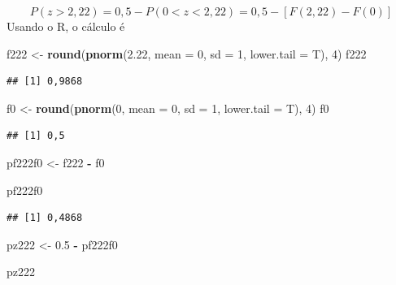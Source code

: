 \documentclass[
]{book}
\newenvironment{Shaded}{\begin{snugshade}}{\end{snugshade}}
\newcommand{\DataTypeTok}[1]{\textcolor[rgb]{0.13,0.29,0.53}{#1}}
\newcommand{\DecValTok}[1]{\textcolor[rgb]{0.00,0.00,0.81}{#1}}
\newcommand{\FloatTok}[1]{\textcolor[rgb]{0.00,0.00,0.81}{#1}}
\newcommand{\KeywordTok}[1]{\textcolor[rgb]{0.13,0.29,0.53}{\textbf{#1}}}
\newcommand{\NormalTok}[1]{#1}
\newcommand{\OperatorTok}[1]{\textcolor[rgb]{0.81,0.36,0.00}{\textbf{#1}}}
\newcommand{\StringTok}[1]{\textcolor[rgb]{0.31,0.60,0.02}{#1}}
\begin{document}
\[
  P(z>2,22) = 0,5 - P(0 < z < 2,22) = 0,5 - [F(2,22) - F(0)]
\]
Usando o R, o cálculo é

\begin{Shaded}
\begin{Highlighting}[]
\NormalTok{f222 <-}\StringTok{ }\KeywordTok{round}\NormalTok{(}\KeywordTok{pnorm}\NormalTok{(}\FloatTok{2.22}\NormalTok{, }\DataTypeTok{mean =} \DecValTok{0}\NormalTok{, }\DataTypeTok{sd =} \DecValTok{1}\NormalTok{, }\DataTypeTok{lower.tail =}\NormalTok{ T), }
    \DecValTok{4}\NormalTok{)}
\NormalTok{f222}
\end{Highlighting}
\end{Shaded}

\begin{verbatim}
## [1] 0,9868
\end{verbatim}

\begin{Shaded}
\begin{Highlighting}[]
\NormalTok{f0 <-}\StringTok{ }\KeywordTok{round}\NormalTok{(}\KeywordTok{pnorm}\NormalTok{(}\DecValTok{0}\NormalTok{, }\DataTypeTok{mean =} \DecValTok{0}\NormalTok{, }\DataTypeTok{sd =} \DecValTok{1}\NormalTok{, }\DataTypeTok{lower.tail =}\NormalTok{ T), }
    \DecValTok{4}\NormalTok{)}
\NormalTok{f0}
\end{Highlighting}
\end{Shaded}

\begin{verbatim}
## [1] 0,5
\end{verbatim}

\begin{Shaded}
\begin{Highlighting}[]
\NormalTok{pf222f0 <-}\StringTok{ }\NormalTok{f222 }\OperatorTok{-}\StringTok{ }\NormalTok{f0}

\NormalTok{pf222f0}
\end{Highlighting}
\end{Shaded}

\begin{verbatim}
## [1] 0,4868
\end{verbatim}

\begin{Shaded}
\begin{Highlighting}[]
\NormalTok{pz222 <-}\StringTok{ }\FloatTok{0.5} \OperatorTok{-}\StringTok{ }\NormalTok{pf222f0}

\NormalTok{pz222}
\end{Highlighting}
\end{Shaded}
\end{document}
